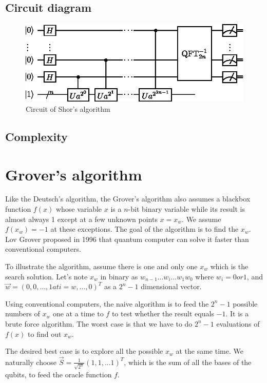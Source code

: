 \documentclass[oneside, letter, 12pt]{book}
\begin{document}
\subsection{Circuit diagram}
\begin{figure}[h]
\includegraphics[width=12cm]{pic/Shor_algorithm.eps}
\caption{Circuit of Shor's algorithm}
\label{ShorAlgorithm}
\end{figure}

\subsection{Complexity}

\section{Grover's algorithm}
Like the Deutsch's algorithm, the Grover's algorithm also assumes a blackbox function $f(x)$ whose variable $x$ is a $n$-bit binary variable while its result is almost always 1 except at a few unknown points $x=x_w$. We assume $f(x_w)=-1$ at these exceptions. The goal of the algorithm is to find the $x_w$. Lov Grover proposed in 1996 that quantum computer can solve it faster than conventional computers.

To illustrate the algorithm, assume there is one and only one $x_w$ which is the search solution. Let's note $x_w$ in binary as $w_{n-1}...w_i...w_1 w_0$ where $w_i = 0 or 1$,
and $\Vec{w} = (0, 0, ..., 1 at i=w, ..., 0)^T$ as a $2^n-1$ dimensional vector.

Using conventional computers, the naive algorithm is to feed the $2^n -1$ possible numbers of $x_w$ one at a time to $f$ to test whether the result equals $-1$. It is a brute force algorithm. The worst case is that we have to do $2^n-1$ evaluations of $f(x)$ to find out $x_w$.

The desired best case is to explore all the possible $x_w$ at the same time. We naturally choose $\vec{S} = \frac 1 {\sqrt{2^n}} (1, 1, ...1)^T$, which is the sum of all the bases of the qubits, to feed the oracle function $f$.
\end{document}
